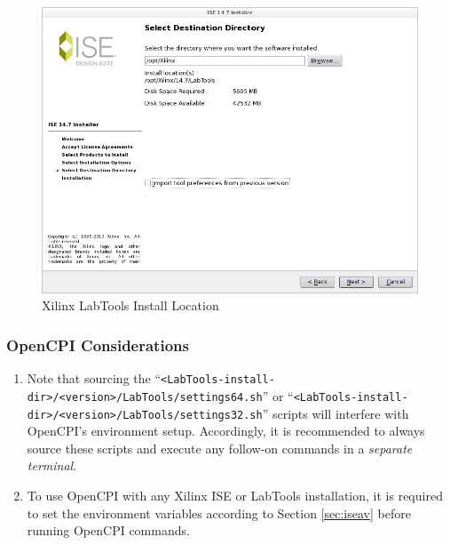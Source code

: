 \begin{flushleft}
\begin{flushleft}
\begin{enumerate}
\begin{figure}[H]
	\centerline{\includegraphics[scale=0.4]{figures/xilinx_labtools_install_location}}
	\caption{Xilinx LabTools Install Location}
\end{figure}
\end{enumerate}

\subsubsection{OpenCPI Considerations}
\begin{enumerate}
\item Note that sourcing the ``\verb+<LabTools-install-dir>/<version>/LabTools/settings64.sh+'' or ``\verb+<LabTools-install-dir>/<version>/LabTools/settings32.sh+'' scripts will interfere with OpenCPI's environment setup. Accordingly, it is recommended to always source these scripts and execute any follow-on commands in a \textit{separate terminal}.
\item To use OpenCPI with any Xilinx ISE or LabTools installation, it is required to set the environment variables according to Section \ref{sec:iseav} before running OpenCPI commands.
\end{enumerate}

\end{flushleft}
\pagebreak

\end{flushleft}

